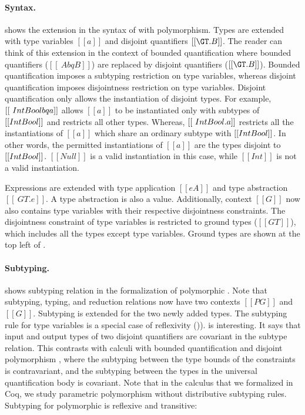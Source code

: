 \paragraph*{Syntax.}
 shows the extension in the syntax of \name
with polymorphism.
Types are extended with type variables $[[a]]$ and
disjoint quantifiers $[[\GT . B]]$.
The reader can think of this extension in the context of
bounded quantification \citep{cardelli1985understanding, canning1989f} where
bounded quantifiers ($[[\ A bq B]]$) are replaced by
disjoint quantifiers ($[[\GT . B]]$).
Bounded quantification imposes a subtyping restriction on type variables,
whereas disjoint quantification imposes disjointness restriction on type variables.
Disjoint quantification only allows the instantiation of disjoint types.
For example, $[[\ Int \/ Bool bq a]]$ allows $[[a]]$ to be instantiated only
with subtypes of $[[Int \/Bool]]$ and restricts all other types.
Whereas, $[[\ Int \/ Bool . a]]$ restricts all the instantiations of
$[[a]]$ which share an ordinary subtype with $[[Int \/ Bool]]$. In other words,
the permitted instantiations of $[[a]]$ are the types disjoint to $[[Int \/ Bool]]$.
$[[Null]]$ is a valid instantiation in this case, while $[[Int]]$ is not a valid
instantiation.

Expressions are extended with type application $[[e A]]$ and
type abstraction $[[\ GT . e]]$. A type abstraction is also a value.
Additionally, context $[[G]]$ now also contains type variables with their
respective disjointness constraints. The disjointness constraint of type variables
is restricted to ground types ($[[GT]]$), which includes all the types
except type variables. Ground types are shown at the top left of
.

\paragraph*{Subtyping.}
shows subtyping relation 
in the formalization of polymorphic \name.
Note that subtyping, typing, and
reduction relations now have two contexts $[[PG]]$ and $[[G]]$.
Subtyping is extended for the two newly added types.
The subtyping rule for type
variables is a special case of reflexivity ()).
 is interesting.
It says that input and output types of two disjoint quantifiers
are covariant in the subtype relation.
This contrasts with calculi with bounded quantification
and disjoint polymorphism \citep{alpuimdisjoint}, where the subtyping between the
type bounds of the constraints is contravariant,
and the subtyping between the types in the universal quantification body is covariant.
Note that in the calculus that we formalized in Coq,
we study parametric polymorphism without distributive subtyping rules.
Subtyping for polymorphic \name is reflexive and transitive:

